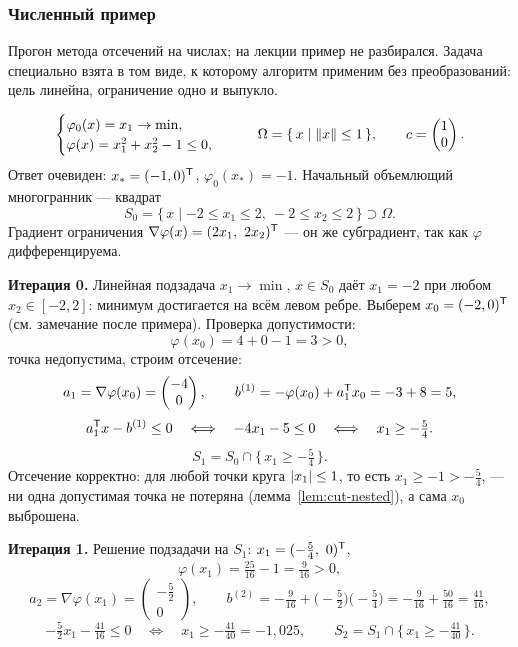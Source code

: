 \subsubsection*{Численный пример}

\begin{idea}[title={Откуда этот материал}]
Прогон метода отсечений на числах; на лекции пример не разбирался. Задача
специально взята в том виде, к которому алгоритм применим без преобразований:
цель линейна, ограничение одно и выпукло.
\end{idea}

\begin{example}\label{ex:cutting-plane-run}
\[
  \begin{cases}
    \varphi_0(x) = x_1 \to \min , \\
    \varphi(x) = x_1^2 + x_2^2 - 1 \le 0 ,
  \end{cases}
  \qquad
  \Omega = \{\, x \mid \left\lVert x \right\rVert \le 1 \,\} ,
  \qquad
  c = \begin{pmatrix} 1 \\ 0 \end{pmatrix} .
\]
Ответ очевиден: $x_* = (-1, 0)^{\mathsf{T}}$, $\varphi_0(x_*) = -1$. Начальный объемлющий
многогранник — квадрат
\[
  S_0 = \{\, x \mid -2 \le x_1 \le 2,\ -2 \le x_2 \le 2 \,\} \supset \Omega .
\]
Градиент ограничения $\nabla\varphi(x) = (2x_1,\ 2x_2)^{\mathsf{T}}$ — он же субградиент,
так как $\varphi$ дифференцируема.

\medskip
\noindent\textbf{Итерация 0.} Линейная подзадача $x_1 \to \min$, $x \in S_0$
даёт $x_1 = -2$ при любом $x_2 \in [-2,2]$: минимум достигается на всём левом
ребре. Выберем $x_0 = (-2, 0)^{\mathsf{T}}$ (см. замечание после примера). Проверка
допустимости:
\[
  \varphi(x_0) = 4 + 0 - 1 = 3 > 0 ,
\]
точка недопустима, строим отсечение:
\[
  a_1 = \nabla\varphi(x_0) = \begin{pmatrix} -4 \\ 0 \end{pmatrix} ,
  \qquad
  b^{(1)} = -\varphi(x_0) + a_1^{\mathsf{T}} x_0 = -3 + 8 = 5 ,
\]
\[
  a_1^{\mathsf{T}} x - b^{(1)} \le 0
  \quad\Longleftrightarrow\quad
  -4x_1 - 5 \le 0
  \quad\Longleftrightarrow\quad
  x_1 \ge -\tfrac54 .
\]
\[
  S_1 = S_0 \cap \big\{\, x_1 \ge -\tfrac54 \,\big\} .
\]
Отсечение корректно: для любой точки круга $\left\lvert x_1 \right\rvert \le 1$, то есть
$x_1 \ge -1 > -\tfrac54$, — ни одна допустимая точка не потеряна
(лемма~\ref{lem:cut-nested}), а сама $x_0$ выброшена.

\medskip
\noindent\textbf{Итерация 1.} Решение подзадачи на $S_1$:
$x_1 = (-\tfrac54,\ 0)^{\mathsf{T}}$,
\[
  \varphi(x_1) = \tfrac{25}{16} - 1 = \tfrac{9}{16} > 0 ,
\]
\[
  a_2 = \nabla\varphi(x_1) = \begin{pmatrix} -\tfrac52 \\ 0 \end{pmatrix} ,
  \qquad
  b^{(2)} = -\tfrac{9}{16} + \Big(-\tfrac52\Big)\Big(-\tfrac54\Big)
          = -\tfrac{9}{16} + \tfrac{50}{16} = \tfrac{41}{16} ,
\]
\[
  -\tfrac52 x_1 - \tfrac{41}{16} \le 0
  \quad\Longleftrightarrow\quad
  x_1 \ge -\tfrac{41}{40} = -1{,}025 ,
  \qquad
  S_2 = S_1 \cap \big\{\, x_1 \ge -\tfrac{41}{40} \,\big\} .
\]


\end{example}
